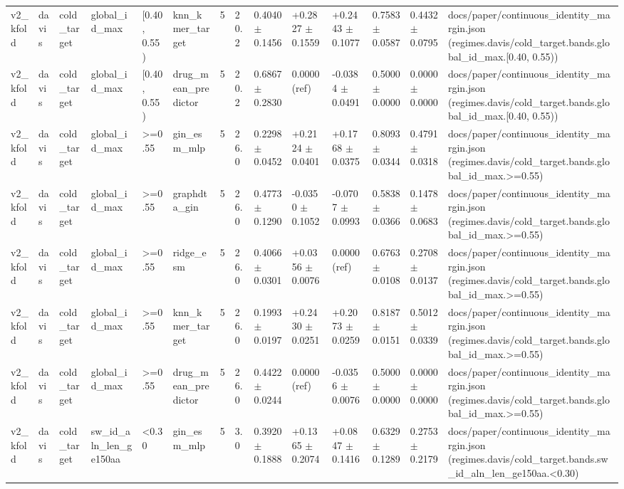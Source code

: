 \begin{table}[htbp]
\begin{tabular}{llllllllllllll}
v2\_kfold & davis & cold\_target & global\_id\_max & [0.40, 0.55) & knn\_kmer\_target & 5 & 20.2 & 0.4040 $\pm$ 0.1456 & +0.2827 $\pm$ 0.1559 & +0.2443 $\pm$ 0.1077 & 0.7583 $\pm$ 0.0587 & 0.4432 $\pm$ 0.0795 & docs/paper/continuous\_identity\_margin.json (regimes.davis/cold\_target.bands.global\_id\_max.[0.40, 0.55)) \\
v2\_kfold & davis & cold\_target & global\_id\_max & [0.40, 0.55) & drug\_mean\_predictor & 5 & 20.2 & 0.6867 $\pm$ 0.2830 & 0.0000 (ref) & -0.0384 $\pm$ 0.0491 & 0.5000 $\pm$ 0.0000 & 0.0000 $\pm$ 0.0000 & docs/paper/continuous\_identity\_margin.json (regimes.davis/cold\_target.bands.global\_id\_max.[0.40, 0.55)) \\
v2\_kfold & davis & cold\_target & global\_id\_max & >=0.55 & gin\_esm\_mlp & 5 & 26.0 & 0.2298 $\pm$ 0.0452 & +0.2124 $\pm$ 0.0401 & +0.1768 $\pm$ 0.0375 & 0.8093 $\pm$ 0.0344 & 0.4791 $\pm$ 0.0318 & docs/paper/continuous\_identity\_margin.json (regimes.davis/cold\_target.bands.global\_id\_max.>=0.55) \\
v2\_kfold & davis & cold\_target & global\_id\_max & >=0.55 & graphdta\_gin & 5 & 26.0 & 0.4773 $\pm$ 0.1290 & -0.0350 $\pm$ 0.1052 & -0.0707 $\pm$ 0.0993 & 0.5838 $\pm$ 0.0366 & 0.1478 $\pm$ 0.0683 & docs/paper/continuous\_identity\_margin.json (regimes.davis/cold\_target.bands.global\_id\_max.>=0.55) \\
v2\_kfold & davis & cold\_target & global\_id\_max & >=0.55 & ridge\_esm & 5 & 26.0 & 0.4066 $\pm$ 0.0301 & +0.0356 $\pm$ 0.0076 & 0.0000 (ref) & 0.6763 $\pm$ 0.0108 & 0.2708 $\pm$ 0.0137 & docs/paper/continuous\_identity\_margin.json (regimes.davis/cold\_target.bands.global\_id\_max.>=0.55) \\
v2\_kfold & davis & cold\_target & global\_id\_max & >=0.55 & knn\_kmer\_target & 5 & 26.0 & 0.1993 $\pm$ 0.0197 & +0.2430 $\pm$ 0.0251 & +0.2073 $\pm$ 0.0259 & 0.8187 $\pm$ 0.0151 & 0.5012 $\pm$ 0.0339 & docs/paper/continuous\_identity\_margin.json (regimes.davis/cold\_target.bands.global\_id\_max.>=0.55) \\
v2\_kfold & davis & cold\_target & global\_id\_max & >=0.55 & drug\_mean\_predictor & 5 & 26.0 & 0.4422 $\pm$ 0.0244 & 0.0000 (ref) & -0.0356 $\pm$ 0.0076 & 0.5000 $\pm$ 0.0000 & 0.0000 $\pm$ 0.0000 & docs/paper/continuous\_identity\_margin.json (regimes.davis/cold\_target.bands.global\_id\_max.>=0.55) \\
v2\_kfold & davis & cold\_target & sw\_id\_aln\_len\_ge150aa & <0.30 & gin\_esm\_mlp & 5 & 3.0 & 0.3920 $\pm$ 0.1888 & +0.1365 $\pm$ 0.2074 & +0.0847 $\pm$ 0.1416 & 0.6329 $\pm$ 0.1289 & 0.2753 $\pm$ 0.2179 & docs/paper/continuous\_identity\_margin.json (regimes.davis/cold\_target.bands.sw\_id\_aln\_len\_ge150aa.<0.30) \\

\end{tabular}
\end{table}
